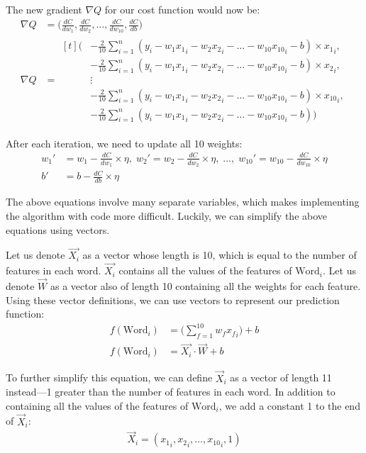 \documentclass[12pt]{article}
\begin{document}
The new gradient $\nabla Q$ for our cost function would now be:
\begin{align*}
	\nabla Q & = \Big(\frac{dC}{dw_1}, \frac{dC}{dw_2}, \dots, \frac{dC}{dw_{10}}, \frac{dC}{db}\Big)
	\\
	\nabla Q & =
	\begin{aligned}[t]
		\Big(
		 & -\frac{2}{10} \sum_{i=1}^{n} (y_i - w_1{x_1}_i - w_2{x_2}_i - \dots - w_{10}{x_{10}}_i - b) \times {x_1}_i,
		\\
		 & -\frac{2}{10} \sum_{i=1}^{n} (y_i - w_1{x_1}_i - w_2{x_2}_i - \dots - w_{10}{x_{10}}_i - b) \times {x_2}_i,
		\\
		 & \vdots
		\\
		 & -\frac{2}{10} \sum_{i=1}^{n} (y_i - w_1{x_1}_i - w_2{x_2}_i - \dots - w_{10}{x_{10}}_i - b) \times {x_{10}}_i,
		\\
		 & -\frac{2}{10} \sum_{i=1}^{n} (y_i - w_1{x_1}_i - w_2{x_2}_i - \dots - w_{10}{x_{10}}_i - b)
		\Big)
	\end{aligned}
\end{align*}

After each iteration, we need to update all 10 weights:
\begin{align*}
	w_1' & = w_1 - \frac{dC}{dw_1} \times \eta,
	\;
	w_2' = w_2 - \frac{dC}{dw_2} \times \eta,
	\;
	\dots,
	\;
	w_{10}' = w_{10} - \frac{dC}{dw_{10}} \times \eta
	\\
	b'   & = b - \frac{dC}{db} \times \eta
\end{align*}

The above equations involve many separate variables, which makes implementing the algorithm with code more difficult. Luckily, we can simplify the above equations using vectors.

Let us denote $\vec{X_i}$ as a vector whose length is 10, which is equal to the number of features in each word. $\vec{X_i}$ contains all the values of the features of $\text{Word}_i$. Let us denote $\vec{W}$ as a vector also of length 10 containing all the weights for each feature. Using these vector definitions, we can use vectors to represent our prediction function:
\begin{align*}
	f(\text{Word}_i) & = \Big(\sum_{f=1}^{10} w_f{x_f}_i\Big) + b
	\\
	f(\text{Word}_i) & = \vec{X_i} \cdot \vec{W} + b
\end{align*}

To further simplify this equation, we can define $\vec{X}_i$ as a vector of length 11 instead—1 greater than the number of features in each word. In addition to containing all the values of the features of $\text{Word}_i$, we add a constant 1 to the end of $\vec{X}_i$:
\begin{align*}
	\vec{X}_i = ({x_1}_i, {x_2}_i, \dots, {x_{10}}_i, 1)
\end{align*}
\end{document}
